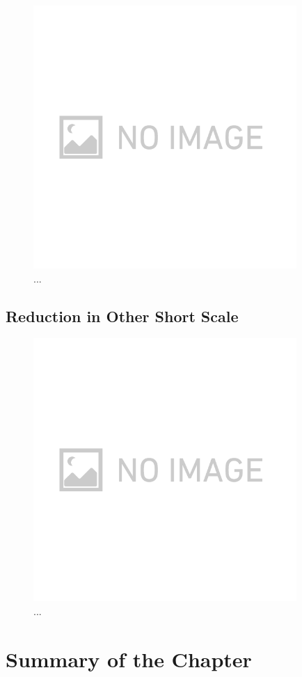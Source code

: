 \begin{figure}[H]
  \begin{center}   
    \includegraphics[width=10.0cm]{./img_chap3/img319.png}
    \caption{...}\label{img:img319}
  \end{center}
\end{figure}

\subsection{Reduction in Other Short Scale}

\begin{figure}[H]
  \begin{center}   
    \includegraphics[width=10.0cm]{./img_chap3/img320.png}
    \caption{...}\label{img:img320}
  \end{center}
\end{figure}



\section{Summary of the Chapter}
